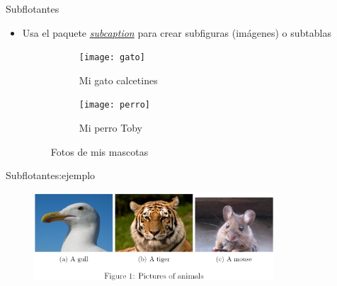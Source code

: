 \begin{frame}[fragile]{Subflotantes}
  \begin{itemize}
    \item Usa el paquete \href{http://texdoc.net/texmf-dist/doc/latex/caption/subcaption.pdf}{\emph{subcaption}} para crear subfiguras (imágenes) o subtablas
          \begin{latexcode}
            \begin{figure}
              \centering
              \begin{subfigure}[b]{0.5\textwidth}
                \texttt{[image: gato]}
                \caption{Mi gato calcetines}
              \end{subfigure}
              \begin{subfigure}[b]{0.5\textwidth}
                \texttt{[image: perro]}
                \caption{Mi perro Toby}
              \end{subfigure}
              \caption{Fotos de mis mascotas}
            \end{figure}
          \end{latexcode}
  \end{itemize}
\end{frame}
\begin{frame}[fragile]{Subflotantes:ejemplo}
  \begin{figure}[b]
  \centering
  \includegraphics[width=0.8\textwidth, height=0.8\textheight, keepaspectratio]{assets/ejemplo2.png}
  \end{figure}
\end{frame}

